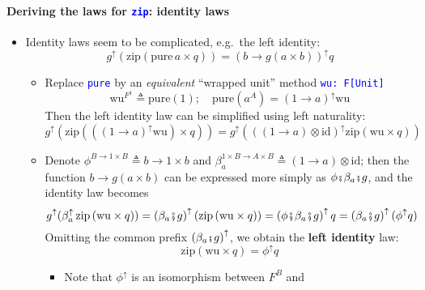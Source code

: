 \paragraph{Deriving the laws for \texttt{\textcolor{blue}{\footnotesize{}zip}}:
identity laws}
\begin{itemize}
\item \vspace{-0.2cm}Identity laws seem to be complicated, e.g.\ the left
identity:{\footnotesize{}
\[
g^{\uparrow}\left(\text{zip}\left(\text{pure}\,a\times q\right)\right)=\left(b\rightarrow g\left(a\times b\right)\right)^{\uparrow}q
\]
}{\footnotesize\par}
\begin{itemize}
\item Replace \texttt{\textcolor{blue}{\footnotesize{}pure}} by an \emph{equivalent}
``wrapped unit'' method \texttt{\textcolor{blue}{\footnotesize{}wu:\ F{[}Unit{]}}}{\footnotesize{}
\[
\text{wu}^{F^{1}}\triangleq\text{pure}\left(1\right);\quad\text{pure}(a^{A})=\left(1\rightarrow a\right)^{\uparrow}\text{wu}
\]
}Then the left identity law can be simplified using left naturality:{\footnotesize{}
\[
g^{\uparrow}\left(\text{zip}\left((\left(1\rightarrow a\right)^{\uparrow}\text{wu})\times q\right)\right)=g^{\uparrow}\left(\left((1\rightarrow a)\otimes\text{id}\right)^{\uparrow}\text{zip}\left(\text{wu}\times q\right)\right)
\]
}{\footnotesize\par}
\item Denote {\footnotesize{}$\phi^{B\rightarrow1\times B}\triangleq b\rightarrow1\times b$}
and {\footnotesize{}$\beta_{a}^{1\times B\rightarrow A\times B}\triangleq\left(1\rightarrow a\right)\otimes\text{id}$};
then the function {\footnotesize{}$b\rightarrow g\left(a\times b\right)$}
can be expressed more simply as {\footnotesize{}$\phi\bef\beta_{a}\bef g$},
and the identity law becomes{\footnotesize{}
\[
g^{\uparrow}(\beta_{a}^{\uparrow}\,\text{zip}\left(\text{wu}\times q\right))=\left(\beta_{a}\bef g\right)^{\uparrow}\left(\text{zip}\left(\text{wu}\times q\right)\right)=\left(\phi\bef\beta_{a}\bef g\right)^{\uparrow}q=\left(\beta_{a}\bef g\right)^{\uparrow}(\phi^{\uparrow}q)
\]
}Omitting the common prefix {\footnotesize{}$\left(\beta_{a}\bef g\right)^{\uparrow}$},
we obtain the \textbf{left identity} law:{\footnotesize{}
\[
\text{zip}\left(\text{wu}\times q\right)=\phi^{\uparrow}q
\]
}{\footnotesize\par}
\begin{itemize}
\item Note that $\phi^{\uparrow}$ is an isomorphism between $F^{B}$ and

\end{itemize}
\end{itemize}
\end{itemize}
